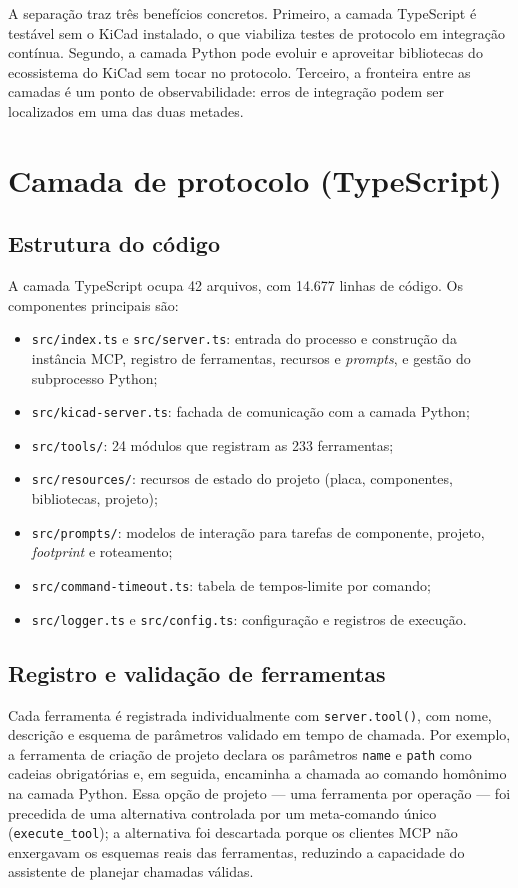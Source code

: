 A separação traz três benefícios concretos. Primeiro, a camada TypeScript é
testável sem o KiCad instalado, o que viabiliza testes de protocolo em
integração contínua. Segundo, a camada Python pode evoluir e aproveitar
bibliotecas do ecossistema do KiCad sem tocar no protocolo. Terceiro, a
fronteira entre as camadas é um ponto de observabilidade: erros de integração
podem ser localizados em uma das duas metades.

\section{Camada de protocolo (TypeScript)}

\subsection{Estrutura do código}

A camada TypeScript ocupa 42 arquivos, com 14.677 linhas de código. Os
componentes principais são:

\begin{itemize}[leftmargin=1.4em,itemsep=0.2em]
  \item \texttt{src/index.ts} e \texttt{src/server.ts}: entrada do processo e
        construção da instância MCP, registro de ferramentas, recursos e
        \emph{prompts}, e gestão do subprocesso Python;
  \item \texttt{src/kicad-server.ts}: fachada de comunicação com a camada
        Python;
  \item \texttt{src/tools/}: 24 módulos que registram as 233 ferramentas;
  \item \texttt{src/resources/}: recursos de estado do projeto (placa,
        componentes, bibliotecas, projeto);
  \item \texttt{src/prompts/}: modelos de interação para tarefas de
        componente, projeto, \emph{footprint} e roteamento;
  \item \texttt{src/command-timeout.ts}: tabela de tempos-limite por comando;
  \item \texttt{src/logger.ts} e \texttt{src/config.ts}: configuração e
        registros de execução.
\end{itemize}

\subsection{Registro e validação de ferramentas}

Cada ferramenta é registrada individualmente com \texttt{server.tool()}, com
nome, descrição e esquema de parâmetros validado em tempo de chamada. Por
exemplo, a ferramenta de criação de projeto declara os parâmetros
\texttt{name} e \texttt{path} como cadeias obrigatórias e, em seguida,
encaminha a chamada ao comando homônimo na camada Python. Essa opção de
projeto --- uma ferramenta por operação --- foi precedida de uma alternativa
controlada por um meta-comando único (\texttt{execute\_tool}); a alternativa
foi descartada porque os clientes MCP não enxergavam os esquemas reais das
ferramentas, reduzindo a capacidade do assistente de planejar chamadas
válidas.

